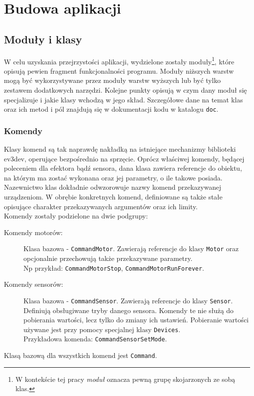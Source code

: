 \chapter{Budowa aplikacji}
\label{ch:budowa_aplikacji}

\section{Moduły i klasy}
\indent \indent W celu uzyskania przejrzystości aplikacji, wydzielone zostały moduły\footnote{W kontekście tej pracy \textit{moduł} oznacza pewną grupę skojarzonych ze sobą klas.}, które opisują pewien fragment funkcjonalności programu. Moduły niższych warstw mogą być wykorzystywane przez moduły warstw wyższych lub być tylko zestawem dodatkowych narzędzi. Kolejne punkty opisują w czym dany moduł się specjalizuje i jakie klasy wchodzą w jego skład. Szczegółowe dane na temat klas oraz ich metod i pól znajdują się w dokumentacji kodu w katalogu {\tt doc}.

\subsection{Komendy}
\indent \indent Klasy komend są tak naprawdę nakładką na istniejące mechanizmy biblioteki ev3dev, operujące bezpośrednio na sprzęcie. Oprócz właściwej komendy, będącej poleceniem dla efektora bądź sensora, dana klasa zawiera referencje do obiektu, na którym ma zostać wykonana oraz jej parametry, o ile takowe posiada. Nazewnictwo klas dokładnie odwzorowuje nazwy komend przekazywanej urządzeniom. W obrębie konkretnych komend, definiowane są także stałe opisujące charakter przekazywanych argumentów oraz ich limity.\\
Komendy zostały podzielone na dwie podgrupy:
\begin{description}
    \item[Komendy motorów:] Klasa bazowa - {\tt CommandMotor}. Zawierają referencje do klasy {\tt Motor} oraz opcjonalnie przechowują także przekazywane parametry. \\Np przykład: {\tt CommandMotorStop}, {\tt CommandMotorRunForever}.

    \item[Komendy sensorów:] Klasa bazowa - {\tt CommandSensor}. Zawierają referencje do klasy {\tt Sensor}. Definiują obsługiwane tryby danego sensora. Komendy te nie służą do pobierania wartości, lecz tylko do zmiany ich ustawień. Pobieranie wartości używane jest przy pomocy specjalnej klasy {\tt Devices}. \\Przykładowa komenda: {\tt CommandSensorSetMode}.
\end{description}
Klasą bazową dla wszystkich komend jest {\tt Command}.

